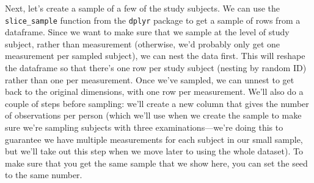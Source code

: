 \documentclass[
]{book}
\begin{document}
Next, let's create a sample of a few of the study subjects. We can use the
\texttt{slice\_sample} function from the \texttt{dplyr} package to get a sample of rows from a
dataframe. Since we want to make sure that we sample at the level of study
subject, rather than measurement (otherwise, we'd probably only get one
measurement per sampled subject), we can nest the data first. This will reshape
the dataframe so that there's one row per study subject (nesting by random ID)
rather than one per measurement. Once we've sampled, we can unnest to get back
to the original dimensions, with one row per measurement. We'll also do a couple
of steps before sampling: we'll create a new column that gives the number of
observations per person (which we'll use when we create the sample to make sure
we're sampling subjects with three examinations---we're doing this to guarantee
we have multiple measurements for each subject in our small sample, but we'll
take out this step when we move later to using the whole dataset). To make sure
that you get the same sample that we show here, you can set the seed to the same
number.
\end{document}
